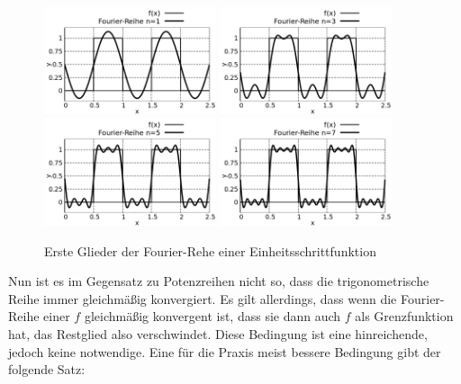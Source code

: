 \begin{figure}
    \centering
    \includegraphics[width=0.45\textwidth]{./gnuplot/fourier-transform-step-1}
    \includegraphics[width=0.45\textwidth]{./gnuplot/fourier-transform-step-2}
    \includegraphics[width=0.45\textwidth]{./gnuplot/fourier-transform-step-3}
    \includegraphics[width=0.45\textwidth]{./gnuplot/fourier-transform-step-4}
    \caption{Erste Glieder der Fourier-Rehe einer Einheitsschrittfunktion }
    \label{fig:ExUnitStepFourier}
\end{figure}

Nun ist es im Gegensatz zu Potenzreihen nicht so, dass die trigonometrische Reihe immer gleichmäßig konvergiert. Es gilt allerdings, dass wenn die Fourier-Reihe einer $f$ gleichmäßig konvergent ist, dass sie dann auch $f$ als Grenzfunktion hat, das Restglied also verschwindet. Diese Bedingung ist eine hinreichende, jedoch keine notwendige. Eine für die Praxis meist bessere Bedingung gibt der folgende Satz:

